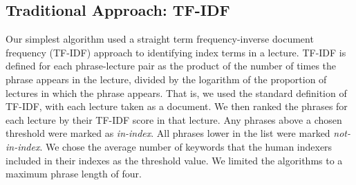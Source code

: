\subsection{Traditional Approach: TF-IDF}
\label{sec:tfidf}


Our simplest algorithm used a straight term frequency-inverse document
frequency (TF-IDF) approach to identifying index terms in a
lecture. TF-IDF is defined for each phrase-lecture pair as the product
of the number of times the phrase appears in the lecture, divided by
the logarithm of the proportion of lectures in which the phrase
appears. That is, we used the standard definition of TF-IDF, with each
lecture taken as a document. We then ranked the phrases for each
lecture by their TF-IDF score in that lecture. Any phrases above a
chosen threshold were marked as {\em in-index}. All phrases lower in
the list were marked {\em not-in-index}. We chose the average number
of keywords that the human indexers included in their indexes as the
threshold value. We limited the algorithms to a maximum phrase length
of four.


